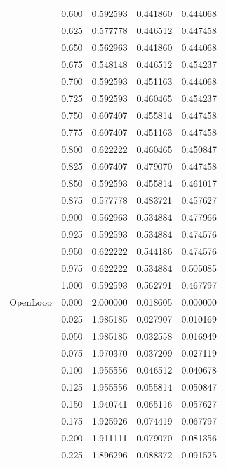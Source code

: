 \begin{tabular}{llrrr}
         & 0.600 &   0.592593 &   0.441860 &   0.444068 \\
         & 0.625 &   0.577778 &   0.446512 &   0.447458 \\
         & 0.650 &   0.562963 &   0.441860 &   0.444068 \\
         & 0.675 &   0.548148 &   0.446512 &   0.454237 \\
         & 0.700 &   0.592593 &   0.451163 &   0.444068 \\
         & 0.725 &   0.592593 &   0.460465 &   0.454237 \\
         & 0.750 &   0.607407 &   0.455814 &   0.447458 \\
         & 0.775 &   0.607407 &   0.451163 &   0.447458 \\
         & 0.800 &   0.622222 &   0.460465 &   0.450847 \\
         & 0.825 &   0.607407 &   0.479070 &   0.447458 \\
         & 0.850 &   0.592593 &   0.455814 &   0.461017 \\
         & 0.875 &   0.577778 &   0.483721 &   0.457627 \\
         & 0.900 &   0.562963 &   0.534884 &   0.477966 \\
         & 0.925 &   0.592593 &   0.534884 &   0.474576 \\
         & 0.950 &   0.622222 &   0.544186 &   0.474576 \\
         & 0.975 &   0.622222 &   0.534884 &   0.505085 \\
         & 1.000 &   0.592593 &   0.562791 &   0.467797 \\
OpenLoop & 0.000 &   2.000000 &   0.018605 &   0.000000 \\
         & 0.025 &   1.985185 &   0.027907 &   0.010169 \\
         & 0.050 &   1.985185 &   0.032558 &   0.016949 \\
         & 0.075 &   1.970370 &   0.037209 &   0.027119 \\
         & 0.100 &   1.955556 &   0.046512 &   0.040678 \\
         & 0.125 &   1.955556 &   0.055814 &   0.050847 \\
         & 0.150 &   1.940741 &   0.065116 &   0.057627 \\
         & 0.175 &   1.925926 &   0.074419 &   0.067797 \\
         & 0.200 &   1.911111 &   0.079070 &   0.081356 \\
         & 0.225 &   1.896296 &   0.088372 &   0.091525 \\

\end{tabular}

